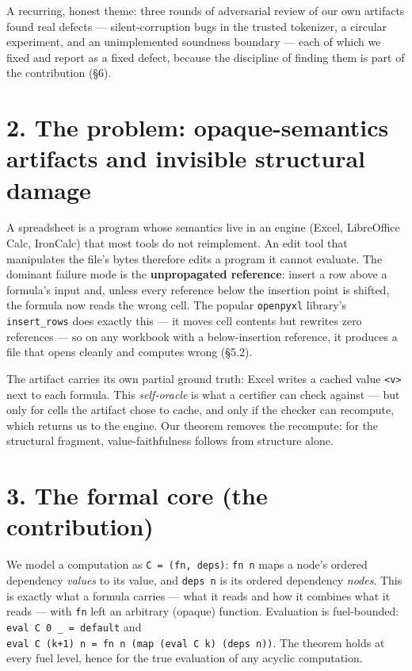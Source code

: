 \documentclass[
  11pt,
]{article}
\begin{document}
A recurring, honest theme: three rounds of adversarial review of our own
artifacts found real defects --- silent-corruption bugs in the trusted
tokenizer, a circular experiment, and an unimplemented soundness
boundary --- each of which we fixed and report as a fixed defect,
because the discipline of finding them is part of the contribution (§6).

\section{2. The problem: opaque-semantics artifacts and invisible
structural
damage}\label{the-problem-opaque-semantics-artifacts-and-invisible-structural-damage}

A spreadsheet is a program whose semantics live in an engine (Excel,
LibreOffice Calc, IronCalc) that most tools do not reimplement. An edit
tool that manipulates the file's bytes therefore edits a program it
cannot evaluate. The dominant failure mode is the \textbf{unpropagated
reference}: insert a row above a formula's input and, unless every
reference below the insertion point is shifted, the formula now reads
the wrong cell. The popular \texttt{openpyxl} library's
\texttt{insert\_rows} does exactly this --- it moves cell contents but
rewrites zero references --- so on any workbook with a below-insertion
reference, it produces a file that opens cleanly and computes wrong
(§5.2).

The artifact carries its own partial ground truth: Excel writes a cached
value \texttt{\textless{}v\textgreater{}} next to each formula. This
\emph{self-oracle} is what a certifier can check against --- but only
for cells the artifact chose to cache, and only if the checker can
recompute, which returns us to the engine. Our theorem removes the
recompute: for the structural fragment, value-faithfulness follows from
structure alone.

\section{3. The formal core (the
contribution)}\label{the-formal-core-the-contribution}

We model a computation as \texttt{C\ =\ (fn,\ deps)}: \texttt{fn\ n}
maps a node's ordered dependency \emph{values} to its value, and
\texttt{deps\ n} is its ordered dependency \emph{nodes}. This is exactly
what a formula carries --- what it reads and how it combines what it
reads --- with \texttt{fn} left an arbitrary (opaque) function.
Evaluation is fuel-bounded: \texttt{eval\ C\ 0\ \_\ =\ default} and
\texttt{eval\ C\ (k+1)\ n\ =\ fn\ n\ (map\ (eval\ C\ k)\ (deps\ n))}.
The theorem holds at every fuel level, hence for the true evaluation of
any acyclic computation.
\end{document}
